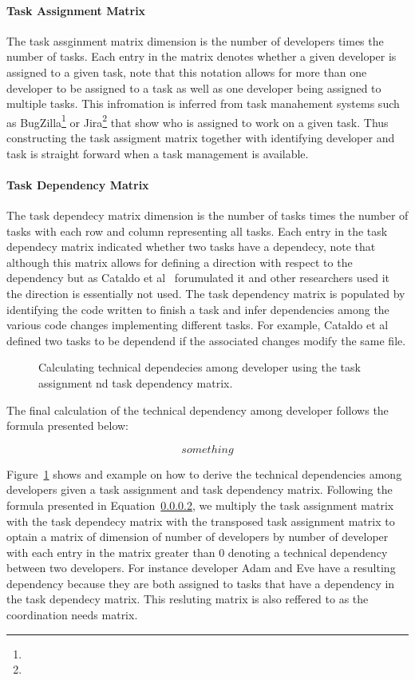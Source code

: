 \paragraph{Task Assignment Matrix}
The task assginment matrix dimension is the number of developers times the number of tasks.
Each entry in the matrix denotes whether a given developer is assigned to a given task, note that this notation allows for more than one developer to be assigned to a task as well as one developer being assigned to multiple tasks.
This infromation is inferred from task manahement systems such as BugZilla\footnote{} or Jira\footnote{} that show who is assigned to work on a given task.
Thus constructing the task assigment matrix together with identifying developer and task is straight forward when a task management is available.

\paragraph{Task Dependency Matrix}
The task dependecy matrix dimension is the number of tasks times the number of tasks with each row and column representing all tasks.
Each entry in the task dependecy matrix indicated whether two tasks have a dependecy, note that although this matrix allows for defining a direction with respect to the dependency but as Cataldo et al~\cite{} forumulated it and other researchers used it~\cite{} the direction is essentially not used.
The task dependency matrix is populated by identifying the code written to finish a task and infer dependencies among the various code changes implementing different tasks.
For example, Cataldo et al~\cite{} defined two tasks to be dependend if the associated changes modify the same file. 

\begin{figure}[ht]
\centering
{}
\caption{Calculating technical dependecies among developer using the task assignment nd task dependency matrix.}
\label{chap:3:fig:example:stc:cataldo}
\end{figure}
The final calculation of the technical dependency among developer follows the formula presented below:

\begin{equation}
something
\end{equation}

Figure~\ref{chap:3:fig:example:stc:cataldo} shows and example on how to derive the technical dependencies among developers given a task assignment and task dependency matrix.
Following the formula presented in Equation~\ref{}, we multiply the task assignment matrix with the task dependecy matrix with the transposed task assignment matrix to optain a matrix of dimension of number of developers by number of developer with each entry in the matrix greater than 0 denoting a technical dependency between two developers.
For instance developer Adam and Eve have a resulting dependency because they are both assigned to tasks that have a dependency in the task dependecy matrix. 
This resluting matrix is also reffered to as the coordination needs matrix.

